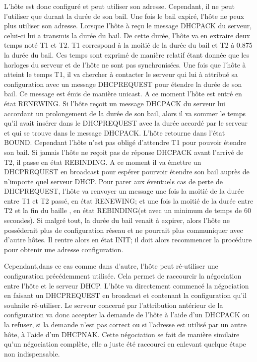 L'hôte est donc configuré et peut utiliser son adresse. Cependant, il ne peut
l'utiliser que durant la durée de son bail. Une fois le bail expiré, l'hôte ne
peux plus utiliser son adresse. Lorsque l'hôte à reçu le message DHCPACK du
serveur, celui-ci lui a transmis la durée du bail. De cette durée, l'hôte va
en extraire deux temps noté T1 et T2. T1 correspond à la moitié de la durée du
bail et T2 à 0.875 la durée du bail. Ces temps sont exprimé de manière relatif
étant donnée que les horloges du serveur et de l'hôte ne sont pas
synchronisées.  Une fois que l'hôte à atteint le temps T1, il va chercher à
contacter le serveur qui lui à attribué sa configuration avec un message
DHCPREQUEST pour étendre la durée de son bail. Ce message est émis de manière
unicast. A ce moment l'hôte est entré en état RENEWING. Si l'hôte reçoit un
message DHCPACK du serveur lui accordant un prolongement de la durée de son
bail, alors il va sommer le temps qu'il avait insérer dans le DHCPREQUEST avec
la durée accordé par le serveur et qui se trouve dans le message DHCPACK.
L'hôte retourne dans l'état BOUND. Cependant l'hôte n'est pas obligé d'attendre
T1 pour pouvoir étendre son bail.  Si jamais l'hôte ne reçoit pas de réponse
DHCPACK avant l'arrivé de T2, il passe en état REBINDING. A ce moment il va
émettre un DHCPREQUEST en broadcast pour espérer pourvoir étendre son bail
auprès de n'importe quel serveur DHCP. Pour parer aux éventuels cas de perte de
DHCPREQUEST, l'hôte va renvoyer un message une fois la moitié de la durée entre
T1 et T2 passé, en état RENEWING; et une fois la moitié de la durée entre T2 et
la fin du baille , en état REBINDING(et avec un minimum de temps de 60
secondes).  Si malgré tout, la durée du bail venait à expirer, alors l'hôte ne
posséderait plus de configuration réseau et ne pourrait plus communiquer avec
d'autre hôtes. Il rentre alors en état INIT; il doit alors recommencer la
procédure pour obtenir une adresse configuration.

Cependant,dans ce cas comme dans d'autre, l'hôte peut ré-utiliser une
configuration précédemment utilisée. Cela permet de raccourcir la négociation
entre l'hôte et le serveur DHCP. L'hôte va directement commencé la négociation
en faisant un DHCPREQUEST en broadcast et contenant la configuration qu'il
souhaite ré-utiliser. Le serveur concerné par l'attribution antérieur de la
configuration va donc accepter la demande de l'hôte à l'aide d'un DHCPACK ou la
refuser, si la demande n'est pas correct ou si l'adresse est utilisé par un
autre hôte, à l'aide d'un DHCPNAK.  Cette négociation se fait de manière
similaire qu'un négociation complète, elle a juste été raccourci en enlevant
quelque étape non indispensable.

